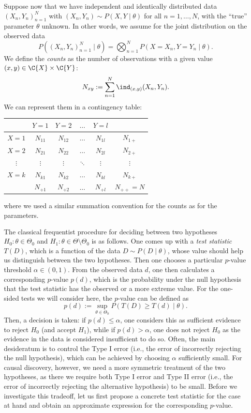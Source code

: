 Suppose now that we have independent and identically distributed data $(X_n,Y_n)_{n=1}^N$ with
$(X_n,Y_n) \sim P(X,Y \mid \theta)$ for all $n=1,\dots,N$, with the ``true'' parameter $\theta$
unknown.
In other words, we assume for the joint distribution on the observed data
$$P((X_n,Y_n)_{n=1}^N \mid \theta) = \bigotimes_{n=1}^N P(X=X_n,Y=Y_n \mid \theta).$$
We define the \emph{counts} as the number of observations with a given value $(x,y)\in\C{X}\times\C{Y}$:
$$N_{xy} := \sum_{n=1}^N \ind_{(x,y)}(X_n,Y_n).$$
We can represent them in a contingency table:
\begin{center}\begin{tabular}{c|cccc|c}
  & $Y=1$         & $Y=2$ & $\dots$ & $Y=l$ \\
  \hline
  $X=1$ & $N_{11}$      & $N_{12}$      & $\dots$ & $N_{1l}$ & $N_{1+}$\\
  $X=2$ & $N_{21}$      & $N_{22}$      & $\dots$ & $N_{2l}$ & $N_{2+}$\\
  $\vdots$ & $\vdots$     & $\vdots$       & $\ddots$ & $\vdots$  & $\vdots$ \\
  $X=k$ & $N_{k1}$      & $N_{k2}$      & $\dots$ & $N_{kl}$ & $N_{k+}$ \\
  \hline
  & $N_{+ 1}$ & $N_{+ 2}$ & $\dots$ & $N_{+ l}$ & $N_{++} = N$\\
\end{tabular}\end{center}
where we used a similar summation convention for the counts as for the parameters.

The classical frequentist procedure for deciding between two hypotheses $H_0 : \theta \in \Theta_0$
and $H_1 : \theta \in \Theta\setminus\Theta_0$ is as follows.
One comes up with a \emph{test statistic} $T(D)$, which is a function of the data $D \sim P(D \mid \theta)$, 
whose value should help us distinguish between the two hypotheses. Then one chooses
a particular $p$-value threshold $\alpha \in (0,1)$. From
the observed data $d$, one then calculates a corresponding $p$-value $p(d)$, which is the probability under 
the null hypothesis that the test statistic has the observed or a more extreme value. For the
one-sided tests we will consider here, the $p$-value can be defined as
$$p(d) := \sup_{\theta\in\Theta_0} P(T(D) \ge T(d) \mid \theta).$$
Then, a decision is taken: if $p(d) \le \alpha$, one considers this as sufficient evidence to reject $H_0$ 
(and accept $H_1$), while if $p(d) > \alpha$, one does not reject $H_0$ as the evidence in the data 
is considered insufficient to do so.
Often, the main desideratum is to control the Type I error (i.e., the error of incorrectly
rejecting the null hypothesis), which can be achieved by choosing $\alpha$ sufficiently small.
For causal discovery, however, we need a more symmetric treatment of the two hypotheses, 
as there we require both Type I error and Type II error (i.e., the error of incorrectly 
rejecting the alternative hypothesis) to be small. Before we investigate this
tradeoff, let us first propose a concrete test statistic for the case at hand and 
obtain an approximate expression for the corresponding $p$-value.

